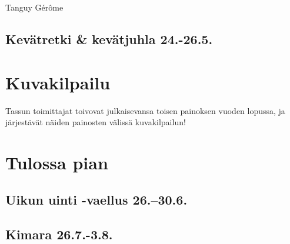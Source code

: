 \documentclass[10pt,finnish,a5paper,twoside=semi]{scrartcl}
\begin{document}
\begin{multicols}{2}
\begin{center}
	\end{center}

	\columnbreak

	\medskip
	\noindent\null\hfill Tanguy Gérôme

\end{multicols}

\clearpage
\subsection{Kevätretki \& kevätjuhla 24.-26.5.}

\clearpage\section{Kuvakilpailu}

Tassun toimittajat toivovat julkaisevansa toisen painoksen vuoden lopussa, ja
järjestävät näiden painosten välissä kuvakilpailun!

\clearpage\section{Tulossa pian}
\subsection{Uikun uinti -vaellus 26.–30.6.}
\subsection{Kimara 26.7.-3.8.}



\clearpage

\thispagestyle{empty}~

\vfill


{
	\noindent
	\begin{center}
	\end{center}
}
\end{document}
